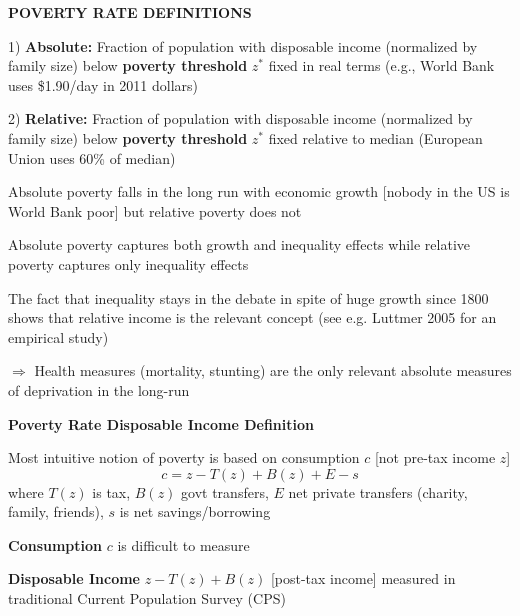 \documentclass[landscape]{slides}
\begin{document}
\begin{slide}
\begin{center}
{\bf POVERTY RATE DEFINITIONS}
\end{center}
1) {\bf Absolute:} Fraction of population with disposable income
(normalized by family size) below {\bf poverty threshold} $z^*$
fixed in real terms (e.g., World Bank uses \$1.90/day in 2011 dollars)

2) {\bf Relative:} Fraction of population with disposable income
(normalized by family size) below {\bf poverty threshold} $z^*$
fixed relative to median (European Union uses 60\% of
median)

\small
Absolute poverty falls in the long run with economic growth
[nobody in the US is World Bank poor] but relative poverty does
not 

Absolute poverty captures both growth and inequality effects while
relative poverty captures only inequality effects

The fact that inequality stays in the debate in spite of huge growth since 1800
shows that relative income is the relevant concept (see e.g. Luttmer 2005 for an empirical study)

$\Rightarrow$ Health measures (mortality, stunting) are the only relevant
absolute measures of deprivation in the long-run

\end{slide}


\begin{slide}

\end{slide}

\begin{slide}
\begin{center}
{\bf Poverty Rate Disposable Income Definition}
\end{center}
Most intuitive notion of poverty is based on consumption $c$ [not
pre-tax income $z$] $$c=z-T(z)+B(z)+E-s$$ where $T(z)$ is tax, $B(z)$ govt
transfers, $E$ net private transfers (charity, family, friends),
$s$ is net savings/borrowing

{\bf Consumption} $c$ is difficult to measure

{\bf Disposable Income} $z-T(z)+B(z)$  [post-tax income] measured
in traditional Current Population Survey (CPS) 

\end{slide}
\end{document}
